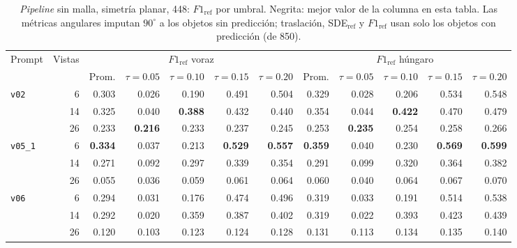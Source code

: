 \begin{table}[htbp]
\centering
\caption{\textit{Pipeline} sin malla, simetría planar, 448: $F1_{\mathrm{ref}}$ por umbral. Negrita: mejor valor de la columna en esta tabla. Las métricas angulares imputan $90^\circ$ a los objetos sin predicción; traslación, SDE$_{\mathrm{ref}}$ y $F1_{\mathrm{ref}}$ usan solo los objetos con predicción (de 850).}
\label{tab:plane_448_f1}
\begin{adjustbox}{max width=\textwidth}
\begin{tabular}{lrrrrrrrrrrr}
\toprule
\multirow{2}{*}{Prompt} & \multirow{2}{*}{Vistas} & \multicolumn{5}{c}{$F1_{\mathrm{ref}}$ voraz} & \multicolumn{5}{c}{$F1_{\mathrm{ref}}$ húngaro} \\
\cmidrule(lr){3-7} \cmidrule(lr){8-12}
 &  & Prom. & $\tau{=}0.05$ & $\tau{=}0.10$ & $\tau{=}0.15$ & $\tau{=}0.20$ & Prom. & $\tau{=}0.05$ & $\tau{=}0.10$ & $\tau{=}0.15$ & $\tau{=}0.20$ \\
\midrule
\multirow{3}{*}{\texttt{v02}} & 6 & 0.303 & 0.026 & 0.190 & 0.491 & 0.504 & 0.329 & 0.028 & 0.206 & 0.534 & 0.548 \\
 & 14 & 0.325 & 0.040 & \textbf{0.388} & 0.432 & 0.440 & 0.354 & 0.044 & \textbf{0.422} & 0.470 & 0.479 \\
 & 26 & 0.233 & \textbf{0.216} & 0.233 & 0.237 & 0.245 & 0.253 & \textbf{0.235} & 0.254 & 0.258 & 0.266 \\
\midrule
\multirow{3}{*}{\texttt{v05\_1}} & 6 & \textbf{0.334} & 0.037 & 0.213 & \textbf{0.529} & \textbf{0.557} & \textbf{0.359} & 0.040 & 0.230 & \textbf{0.569} & \textbf{0.599} \\
 & 14 & 0.271 & 0.092 & 0.297 & 0.339 & 0.354 & 0.291 & 0.099 & 0.320 & 0.364 & 0.382 \\
 & 26 & 0.055 & 0.036 & 0.059 & 0.061 & 0.064 & 0.060 & 0.040 & 0.064 & 0.067 & 0.070 \\
\midrule
\multirow{3}{*}{\texttt{v06}} & 6 & 0.294 & 0.031 & 0.176 & 0.474 & 0.496 & 0.319 & 0.033 & 0.191 & 0.514 & 0.538 \\
 & 14 & 0.292 & 0.020 & 0.359 & 0.387 & 0.402 & 0.319 & 0.022 & 0.393 & 0.423 & 0.439 \\
 & 26 & 0.120 & 0.103 & 0.123 & 0.124 & 0.128 & 0.131 & 0.113 & 0.134 & 0.135 & 0.140 \\
\bottomrule
\end{tabular}
\end{adjustbox}
\end{table}

